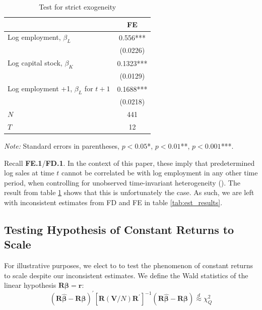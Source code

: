 \documentclass[11pt]{article}
\begin{document}
\begin{table}[H]
    \centering
    \caption{Test for strict exogeneity}
    \label{tab:strict_exo}
    \begin{threeparttable}
        \begin{tabular}{lc}
        \toprule
                                                    & FE       \\
        \midrule
        Log employment, $\beta_L$                    &  0.556*** \\
                                                     &  (0.0226) \\
        Log capital stock, $\beta_K$                &  0.1323*** \\
                                                     &  (0.0129) \\
        Log employment +1, $\beta_L$ for $t+1$      &  0.1688*** \\
                                                 &  (0.0218) \\
                                \midrule
        $N$                                         &        441 \\
        $T$                                        &         12  \\
        \bottomrule
        \end{tabular}
            \begin{tablenotes}
                \footnotesize \textit{Note:} Standard errors in parentheses, $p<0.05$*, $p<0.01$**, $p<0.001$***.
            \end{tablenotes}
    \end{threeparttable}
\end{table}

Recall \textbf{FE.1}/\textbf{FD.1}. In the context of this paper, these imply that predetermined log sales at time $t$ cannot be correlated be with log employment in any other time period, when controlling for unobserved time-invariant heterogeneity (\cite{Wooldridge_2016_serial_corr}). The result from table \ref{tab:strict_exo} shows that this is unfortunately the case. As such, we are left with inconsistent estimates from FD and FE in table \ref{tab:est_results}.

\subsection{Testing Hypothesis of Constant Returns to Scale}
For illustrative purposes, we elect to to test the phenomenon of constant returns to scale despite our inconsistent estimates. We define the Wald statistics of the linear hypothesis $\mathbf{R\beta=r}$:
\begin{equation*}
    (\mathbf{R} \widehat{\boldsymbol{\beta}}-\mathbf{R} \boldsymbol{\beta})^{\prime}\left[\mathbf{R}(\mathbf{V} / N) \mathbf{R}^{\prime}\right]^{-1}(\mathbf{R} \widehat{\boldsymbol{\beta}}-\mathbf{R} \boldsymbol{\beta}) \stackrel{d}{\approx} \chi_Q^2
\end{equation*}
\end{document}
